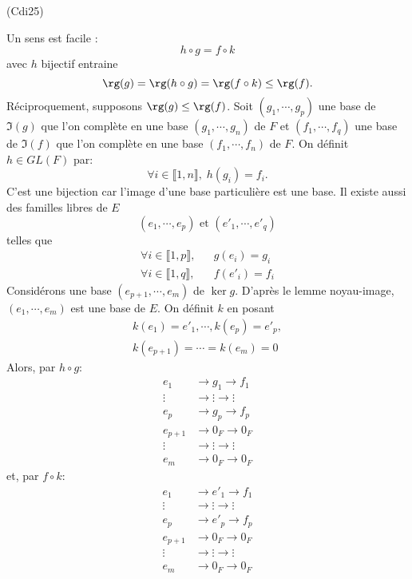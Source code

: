 \begin{tiny}(Cdi25)\end{tiny} Un sens est facile :
\begin{displaymath}
 h \circ g = f \circ k
\end{displaymath}
avec $h$ bijectif entraine
\begin{displaymath}
 \rg(g) = \rg(h \circ g) = \rg(f \circ k) \leq \rg(f).
\end{displaymath}
Réciproquement, supposons $\rg(g) \leq \rg(f)$.\newline
Soit $(g_1,\cdots, g_p)$ une base de $\Im(g)$ que l'on complète en une base $(g_1,\cdots, g_n)$ de $F$ et $(f_1, \cdots , f_q)$ une base de $\Im(f)$ que l'on complète en une base $(f_1, \cdots , f_n)$ de $F$. On définit $h\in GL(F)$ par:
\begin{displaymath}
 \forall i \in \llbracket 1,n \rrbracket, \; h(g_i) = f_i.
\end{displaymath}
C'est une bijection car l'image d'une base particulière est une base. Il existe aussi des familles libres de $E$ 
\begin{displaymath}
 (e_1,\cdots,e_p) \text{ et } (e'_1,\cdots,e'_q)
\end{displaymath}
telles que 
\begin{align*}
 \forall i \in \llbracket 1,p \rrbracket,& &g(e_i) = g_i\\
 \forall i \in \llbracket 1,q \rrbracket,& &f(e'_i) = f_i
\end{align*}
Considérons une base $(e_{p+1},\cdots,e_m)$ de $\ker g$. D'après le lemme noyau-image, $(e_1,\cdots,e_m)$ est une base de $E$. On définit $k$ en posant
\begin{multline*}
 k(e_1) = e'_1, \cdots, k(e_p) = e'_p, \\ k(e_{p+1})= \cdots = k(e_m) = 0
\end{multline*}
Alors, par $h\circ g$:
\begin{align*}
 e_1 &\rightarrow g_1 \rightarrow f_1 \\
 \vdots &\rightarrow \vdots \rightarrow \vdots \\
 e_p &\rightarrow g_p \rightarrow f_p \\
 e_{p+1} &\rightarrow 0_F \rightarrow 0_F \\
 \vdots &\rightarrow \vdots \rightarrow \vdots \\
 e_{m} &\rightarrow 0_F \rightarrow 0_F
\end{align*}
et, par $f\circ k$:
\begin{align*}
 e_1 &\rightarrow e'_1 \rightarrow f_1 \\
 \vdots &\rightarrow \vdots \rightarrow \vdots \\
 e_p &\rightarrow e'_p \rightarrow f_p \\
 e_{p+1} &\rightarrow 0_F \rightarrow 0_F \\
 \vdots &\rightarrow \vdots \rightarrow \vdots \\
 e_{m} &\rightarrow 0_F \rightarrow 0_F
\end{align*}

